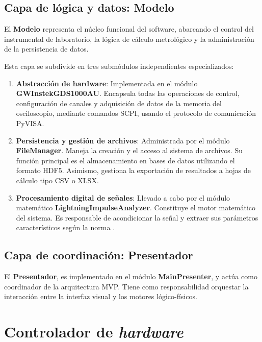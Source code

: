 \subsection{Capa de lógica y datos: Modelo}
\label{subsec:modelo}

El \textbf{Modelo} representa el núcleo funcional del software, abarcando el control del instrumental de laboratorio, la lógica de cálculo metrológico y la administración de la persistencia de datos.

Esta capa se subdivide en tres submódulos independientes especializados:

\begin{enumerate}
    \item \textbf{Abstracción de hardware}: Implementada en el módulo \textbf{GWInstekGDS1000AU}. Encapsula todas las operaciones de control, configuración de canales y adquisición de datos de la memoria del osciloscopio, mediante comandos SCPI, usando el protocolo de comunicación PyVISA.
    \item \textbf{Persistencia y gestión de archivos}: Administrada por el módulo \textbf{FileManager}. Maneja la creación y el acceso al sistema de archivos. Su función principal es el almacenamiento en bases de datos utilizando el formato HDF5. Asimismo, gestiona la exportación de resultados a hojas de cálculo tipo CSV o XLSX.
    \item \textbf{Procesamiento digital de señales}: Llevado a cabo por el módulo matemático \textbf{LightningImpulseAnalyzer}. Constituye el motor matemático del sistema. Es responsable de acondicionar la señal y extraer sus parámetros característicos según la norma \cite{iec60060_1}.
\end{enumerate}

\subsection{Capa de coordinación: Presentador}
\label{subsec:presentador}

El \textbf{Presentador}, es implementado en el módulo \textbf{MainPresenter}, y actúa como coordinador de la arquitectura MVP. Tiene como responsabilidad orquestar la interacción entre la interfaz visual y los motores lógico-físicos.

\section{Controlador de \emph{hardware}}
\label{sec:controlador_osciloscopio}

